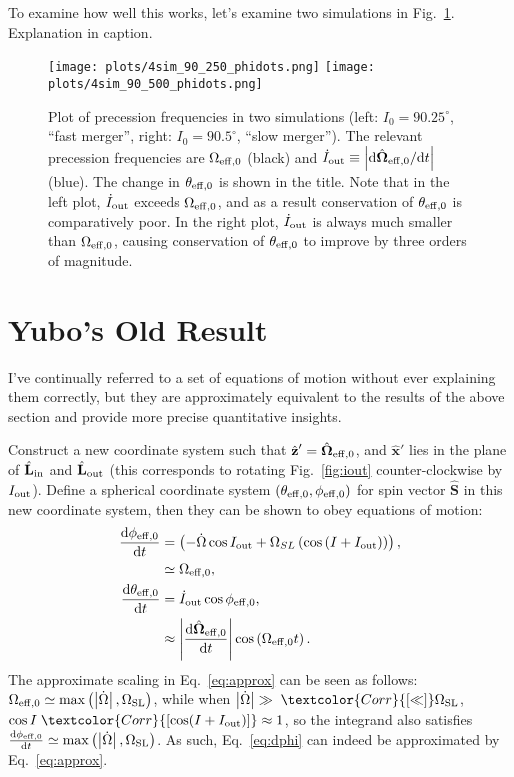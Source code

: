 \documentclass[11pt,
        usenames, %
        dvipsnames %
    ]{article}
\newcommand*{\rd}[2]{\frac{\mathrm{d}#1}{\mathrm{d}#2}}
\newcommand*{\rdil}[2]{\mathrm{d}#1 / \mathrm{d}#2}
\newcommand*{\bm}[1]{\boldsymbol{\mathbf{#1}}}
\newcommand*{\uv}[1]{\hat{\bm{#1}}}
\newcommand*{\abs}[1]{\left|#1\right|}
\newcommand*{\p}[1]{\left(#1\right)}
\begin{document}
To examine how well this works, let's examine two simulations in
Fig.~\ref{fig:phidots}. Explanation in caption.
\begin{figure}
    \centering
    \texttt{[image: plots/4sim\_90\_250\_phidots.png]}
    \texttt{[image: plots/4sim\_90\_500\_phidots.png]}
    \caption{Plot of precession frequencies in two simulations (left: $I_0 =
    90.25^\circ$, ``fast merger'', right: $I_0 = 90.5^\circ$, ``slow merger'').
    The relevant precession frequencies are $\Omega_{\rm eff,0}$ (black) and
    $\dot{I}_{\rm out} \equiv \abs{\rdil{\uv{\Omega}_{\rm eff,0}}{t}}$ (blue). The
    change in $\theta_{\rm eff, 0}$ is shown in the title.
    Note that in the left plot, $\dot{I}_{\rm out}$ exceeds $\Omega_{\rm eff,0}$,
    and as a result conservation of $\theta_{\rm eff,0}$ is comparatively poor.
    In the right plot, $\dot{I}_{\rm out}$ is always much smaller than
    $\Omega_{\rm eff,0}$, causing conservation of $\theta_{\rm eff, 0}$ to
    improve by three orders of magnitude.}\label{fig:phidots}
\end{figure}

\section{Yubo's Old Result}\label{s:old_result}

I've continually referred to a set of equations of motion without ever
explaining them correctly, but they are approximately equivalent to the results
of the above section and provide more precise quantitative insights.

Construct a new coordinate system such that $\uv{z}' = \uv{\Omega}_{\rm eff,
0}$, and $\uv{x}'$ lies in the plane of $\uv{L}_{\rm in}$ and $\uv{L}_{\rm out}$
(this corresponds to rotating Fig.~\ref{fig:iout} counter-clockwise by $I_{\rm
out}$). Define a spherical coordinate system $\p{\theta_{\rm eff, 0}, \phi_{\rm
eff, 0}}$ for spin vector $\uv{S}$ in this new coordinate system, then they can
be shown to obey equations of motion:
\begin{align}
    \rd{\phi_{\rm eff,0}}{t} &= \p{-\dot{\Omega}\cos I_{\rm out}
            + \Omega_{SL}\p{\cos \p{I + I_{\rm out}}}}\label{eq:dphi},\\
        &\simeq \Omega_{\rm eff, 0}\label{eq:approx},\\
    \rd{\theta_{\rm eff,0}}{t} &= \dot{I}_{\rm out}\cos \phi_{\rm eff,
            0}\label{eq:dqreal},\\
        &\approx \abs{\rd{\uv{\Omega}_{\rm eff,0}}{t}}
            \cos \p{\Omega_{\rm eff, 0}t}.\label{eq:dq}
\end{align}
The approximate scaling in Eq.~\eqref{eq:approx} can be seen as follows:
$\Omega_{\rm eff, 0} \simeq \max\p{\abs{\dot{\Omega}}, \Omega_{\rm SL}}$, while
when $\abs{\dot{\Omega}} \gg\; \textcolor{Corr}{[\ll]} \Omega_{\rm SL}$, $\cos I
\; \textcolor{Corr}{[\cos (I + I_{\rm out})]}\approx 1$, so the integrand also
satisfies $\rd{\phi_{\rm eff,0}}{t} \simeq \max\p{\abs{\dot{\Omega}},
\Omega_{\rm SL}}$. As such, Eq.~\eqref{eq:dphi} can indeed be approximated by
Eq.~\eqref{eq:approx}.
\end{document}
